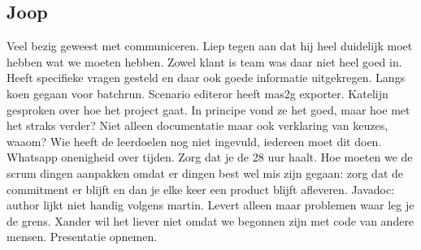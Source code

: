 \documentclass{article}
\begin{document}
\subsection{Joop}
Veel bezig geweest met communiceren. Liep tegen aan dat hij heel duidelijk moet hebben wat we moeten hebben. Zowel klant is team was daar niet heel goed in. Heeft specifieke vragen gesteld en daar ook goede informatie uitgekregen. Langs koen gegaan voor batchrun. Scenario editeror heeft mas2g exporter. Katelijn gesproken over hoe het project gaat. In principe vond ze het goed, maar hoe met het straks verder? Niet alleen documentatie maar ook verklaring van keuzes, waaom? 
Wie heeft de leerdoelen nog niet ingevuld, iedereen moet dit doen. Whatsapp onenigheid over tijden. Zorg dat je de 28 uur haalt. 
Hoe moeten we de scrum dingen aanpakken omdat er dingen best wel mis zijn gegaan: zorg dat de commitment er blijft en dan je elke keer een product blijft afleveren. 
Javadoc: author lijkt niet handig volgens martin. Levert alleen maar problemen waar leg je de grens. Xander wil het liever niet omdat we begonnen zijn met code van andere mensen. 
Presentatie opnemen. 
\end{document}

